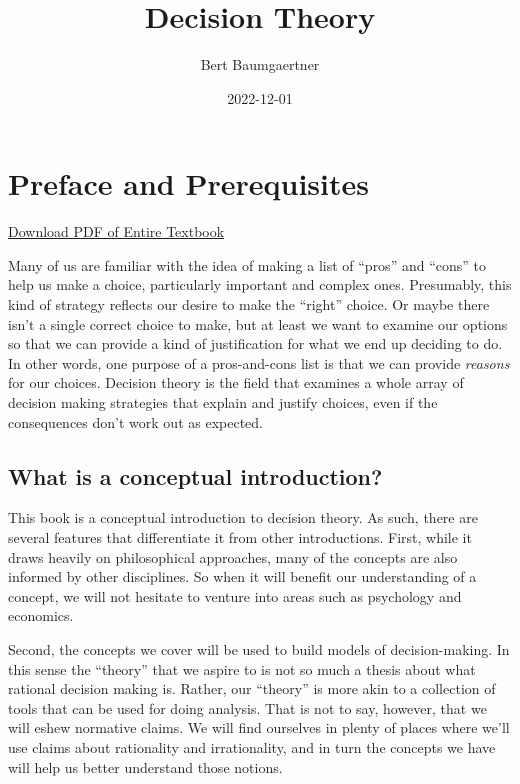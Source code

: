 \documentclass[]{tufte-book}
\title{Decision Theory}
\author{Bert Baumgaertner}
\date{2022-12-01}
\begin{document}
\maketitle



{
\setcounter{tocdepth}{0}
\tableofcontents
}

\hypertarget{preface-and-prerequisites}{%
\chapter*{Preface and Prerequisites}\label{preface-and-prerequisites}}

\href{decisiontheory.pdf}{Download PDF of Entire Textbook}

Many of us are familiar with the idea of making a list of ``pros'' and ``cons'' to help us make a choice, particularly important and complex ones. Presumably, this kind of strategy reflects our desire to make the ``right'' choice. Or maybe there isn't a single correct choice to make, but at least we want to examine our options so that we can provide a kind of justification for what we end up deciding to do. In other words, one purpose of a pros-and-cons list is that we can provide \emph{reasons} for our choices. Decision theory is the field that examines a whole array of decision making strategies that explain and justify choices, even if the consequences don't work out as expected.

\hypertarget{what-is-a-conceptual-introduction}{%
\section{What is a conceptual introduction?}\label{what-is-a-conceptual-introduction}}

This book is a conceptual introduction to decision theory. As such, there are several features that differentiate it from other introductions. First, while it draws heavily on philosophical approaches, many of the concepts are also informed by other disciplines. So when it will benefit our understanding of a concept, we will not hesitate to venture into areas such as psychology and economics.

Second, the concepts we cover will be used to build models of decision-making. In this sense the ``theory'' that we aspire to is not so much a thesis about what rational decision making is. Rather, our ``theory'' is more akin to a collection of tools that can be used for doing analysis. That is not to say, however, that we will eshew normative claims. We will find ourselves in plenty of places where we'll use claims about rationality and irrationality, and in turn the concepts we have will help us better understand those notions.
\end{document}
